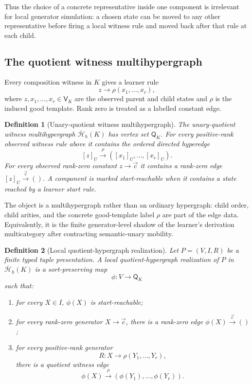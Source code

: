 \documentclass[11pt]{article}
\newtheorem{definition}{Definition}[section]
\begin{document}
Thus the choice of a concrete representative inside one component is
irrelevant for local generator simulation: a chosen state can be moved to any
other representative before firing a local witness rule and moved back after
that rule at each child.

\subsection{The quotient witness multihypergraph}

Every composition witness in $K$ gives a learner rule
\[
  z\longrightarrow
  \rho(x_1,\ldots,x_r),
\]
where $z,x_1,\ldots,x_r\in\mathsf V_K$ are the observed parent and child
states and $\rho$ is the induced good template.  Rank zero is treated as a labelled constant edge.

\begin{definition}[Unary-quotient witness multihypergraph]
\label{def:quotient-witness-hypergraph}
The \emph{unary-quotient witness multihypergraph}
$\overline{\mathcal H}_h(K)$ has vertex set $\mathsf Q_K$.  For every
positive-rank observed witness rule above it contains the ordered directed
hyperedge
\[
  [z]_U
  \xrightarrow{\ \rho\ }
  ([x_1]_U,\ldots,[x_r]_U).
\]
For every observed rank-zero constant $z\to\vec c$ it contains a rank-zero
edge $[z]_U\xrightarrow{\vec c}()$.  A component is marked start-reachable
when it contains a state reached by a learner start rule.
\end{definition}

The object is a multihypergraph rather than an ordinary hypergraph: child order,
child arities, and the concrete good-template label $\rho$ are part of the
edge data.  Equivalently, it is the finite generator-level shadow of the
learner's derivation multicategory after contracting semantic-unary mobility.

\begin{definition}[Local quotient-hypergraph realization]
\label{def:local-hypergraph-realization}
Let $P=(V,I,R)$ be a finite typed tuple presentation.  A \emph{local
quotient-hypergraph realization} of $P$ in
$\overline{\mathcal H}_h(K)$ is a sort-preserving map
\[
  \phi:V\to\mathsf Q_K
\]
such that:
\begin{enumerate}[label=(\roman*)]
\item for every $X\in I$, $\phi(X)$ is start-reachable;
\item for every rank-zero generator $X\to\vec c$, there is a rank-zero edge
      $\phi(X)\xrightarrow{\vec c}()$;
\item for every positive-rank generator
\[
  R:X\to\rho(Y_1,\ldots,Y_r),
\]
there is a quotient witness edge
\[
  \phi(X)
  \xrightarrow{\ \rho\ }
  (\phi(Y_1),\ldots,\phi(Y_r)).
\]
\end{enumerate}
\end{definition}
\end{document}
